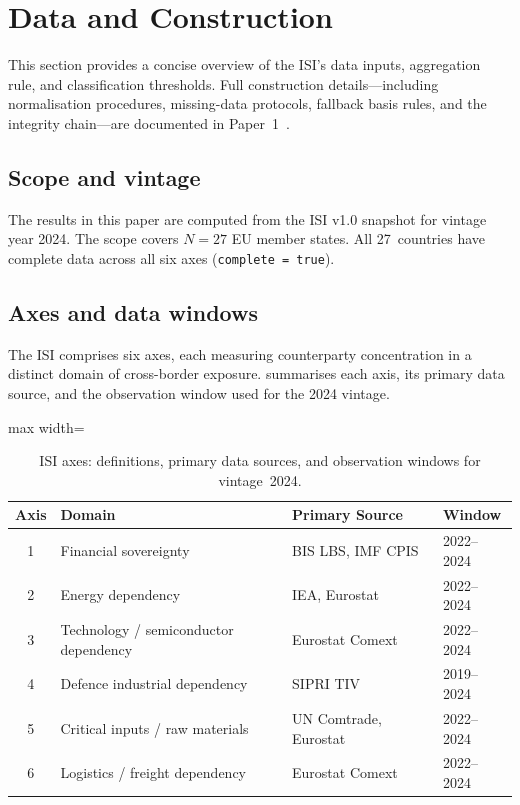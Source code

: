 \section{Data and Construction}\label{sec:data-construction}

This section provides a concise overview of the ISI's data inputs,
aggregation rule, and classification thresholds.  Full construction
details---including normalisation procedures, missing-data protocols,
fallback basis rules, and the integrity chain---are documented in
Paper~1~\cite{isi_paper1}.

\subsection{Scope and vintage}

The results in this paper are computed from the ISI v1.0 snapshot for
vintage year 2024.  The scope covers $N = 27$ EU member states.  All
27~countries have complete data across all six axes
(\texttt{complete = true}).

\subsection{Axes and data windows}

The ISI comprises six axes, each measuring counterparty concentration
in a distinct domain of cross-border exposure.  
summarises each axis, its primary data source, and the observation
window used for the 2024 vintage.

\begin{table}[htbp]
\centering
\caption{ISI axes: definitions, primary data sources, and observation
  windows for vintage~2024.}
\label{tab:axis-sources}
\small
\begin{adjustbox}{max width=\textwidth}
\begin{tabular}{@{}clll@{}}
\toprule
\textbf{Axis} & \textbf{Domain} & \textbf{Primary Source}
  & \textbf{Window} \\
\midrule
1 & Financial sovereignty
  & BIS LBS, IMF CPIS~\cite{bis_lbs,imf_cpis}
  & 2022--2024 \\
2 & Energy dependency
  & IEA, Eurostat~\cite{iea_wes,eurostat_comext}
  & 2022--2024 \\
3 & Technology / semiconductor dependency
  & Eurostat Comext~\cite{eurostat_comext}
  & 2022--2024 \\
4 & Defence industrial dependency
  & SIPRI TIV~\cite{sipri_transfers}
  & 2019--2024 \\
5 & Critical inputs / raw materials
  & UN Comtrade, Eurostat~\cite{uncomtrade,eurostat_comext}
  & 2022--2024 \\
6 & Logistics / freight dependency
  & Eurostat Comext~\cite{eurostat_comext}
  & 2022--2024 \\
\bottomrule
\end{tabular}
\end{adjustbox}
\end{table}

